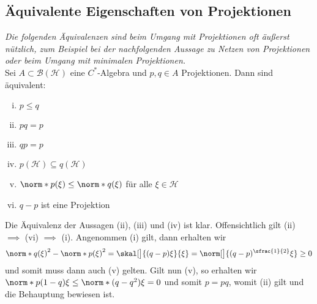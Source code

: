 \subsection{Äquivalente Eigenschaften von Projektionen} %
\label{sub:aquivalente_eigenschaften_von_projektionen}
\emph{Die folgenden Äquivalenzen sind beim Umgang mit Projektionen oft äußerst nützlich, zum Beispiel bei der nachfolgenden Aussage zu Netzen von Projektionen oder beim Umgang mit minimalen Projektionen.}\smallskip\\
Sei $A \subset \mathcal{B}(\mathcal{H})$ eine $C^*$-Algebra und $p,q \in A$ Projektionen.
Dann sind äquivalent:\\[-1em]
\begin{multicols}{2}
	\begin{enumerate}[(i),itemsep=0pt]
		\item $p \le q$
		\item $pq=p$
		\item $qp=p$
		\item $p(\mathcal{H}) \subseteq q(\mathcal{H})$
		\item $\norm*{p(\xi)} \le \norm*{q(\xi)}$ für alle $\xi \in \mathcal{H}$
		\item $q-p$ ist eine Projektion
	\end{enumerate}
\end{multicols}%
\begin{beweis}
	Die Äquivalenz der Aussagen (ii), (iii) und (iv) ist klar.
	Offensichtlich gilt (ii) $\implies$ (vi) $\implies$ (i).
	Angenommen (i) gilt, dann erhalten wir
	\[
		\norm*{q(\xi)}^2 - \norm*{p(\xi)}^2 = \skal[\big]{(q-p)\xi}{\xi} = \norm[\big]{(q-p)^{\sfrac{1}{2}} \xi} \ge 0
	\]
	und somit muss dann auch (v) gelten. 
	Gilt nun (v), so erhalten wir
	\(
		\norm*{p(1-q)\xi} \le \norm*{(q-q^2) \xi} = 0
	\)
	und somit $p=pq$, womit (ii) gilt und die Behauptung bewiesen ist.
\end{beweis}

